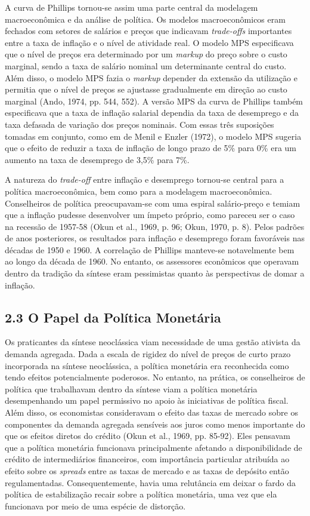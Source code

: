 \documentclass[12pt]{article}
\begin{document}
A curva de Phillips tornou-se assim uma parte central da modelagem macroeconômica e da análise de política. Os modelos macroeconômicos eram fechados com setores de salários e preços que indicavam \textit{trade-offs} importantes entre a taxa de inflação e o nível de atividade real. O modelo MPS especificava que o nível de preços era determinado por um \textit{markup} do preço sobre o custo marginal, sendo a taxa de salário nominal um determinante central do custo. Além disso, o modelo MPS fazia o \textit{markup} depender da extensão da utilização e permitia que o nível de preços se ajustasse gradualmente em direção ao custo marginal (Ando, 1974, pp. 544, 552). A versão MPS da curva de Phillips também especificava que a taxa de inflação salarial dependia da taxa de desemprego e da taxa defasada de variação dos preços nominais. Com essas três suposições tomadas em conjunto, como em de Menil e Enzler (1972), o modelo MPS sugeria que o efeito de reduzir a taxa de inflação de longo prazo de 5\% para 0\% era um aumento na taxa de desemprego de 3,5\% para 7\%.

A natureza do \textit{trade-off} entre inflação e desemprego tornou-se central para a política macroeconômica, bem como para a modelagem macroeconômica. Conselheiros de política preocupavam-se com uma espiral salário-preço e temiam que a inflação pudesse desenvolver um ímpeto próprio, como pareceu ser o caso na recessão de 1957-58 (Okun et al., 1969, p. 96; Okun, 1970, p. 8). Pelos padrões de anos posteriores, os resultados para inflação e desemprego foram favoráveis nas décadas de 1950 e 1960. A correlação de Phillips manteve-se notavelmente bem ao longo da década de 1960. No entanto, os assessores econômicos que operavam dentro da tradição da síntese eram pessimistas quanto às perspectivas de domar a inflação.

\subsection{2.3 O Papel da Política Monetária}

Os praticantes da síntese neoclássica viam necessidade de uma gestão ativista da demanda agregada. Dada a escala de rigidez do nível de preços de curto prazo incorporada na síntese neoclássica, a política monetária era reconhecida como tendo efeitos potencialmente poderosos. No entanto, na prática, os conselheiros de política que trabalhavam dentro da síntese viam a política monetária desempenhando um papel permissivo no apoio às iniciativas de política fiscal. Além disso, os economistas consideravam o efeito das taxas de mercado sobre os componentes da demanda agregada sensíveis aos juros como menos importante do que os efeitos diretos do crédito (Okun et al., 1969, pp. 85-92). Eles pensavam que a política monetária funcionava principalmente afetando a disponibilidade de crédito de intermediários financeiros, com importância particular atribuída ao efeito sobre os \textit{spreads} entre as taxas de mercado e as taxas de depósito então regulamentadas. Consequentemente, havia uma relutância em deixar o fardo da política de estabilização recair sobre a política monetária, uma vez que ela funcionava por meio de uma espécie de distorção.
\end{document}
